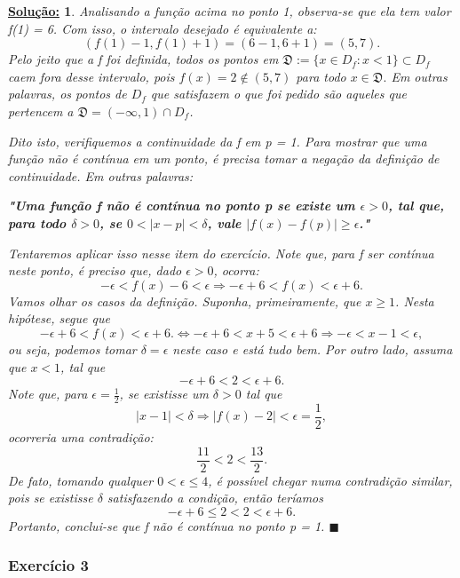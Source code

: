 \documentclass{article}
\newtheorem*{sol*}{\underline{Solu\c c\~ao:}}
\renewcommand\qedsymbol{$\blacksquare$}
\begin{document}
\begin{sol*}
Analisando a fun\c c\~ao acima no ponto 1, observa-se que ela tem valor f(1) = 6. Com isso, o intervalo desejado \'e equivalente a:
$$
(f(1) - 1, f(1) + 1) = (6 - 1, 6 + 1) = (5, 7).
$$
Pelo jeito que a f foi definida, todos os pontos em $\mathfrak{D}:=\{x\in{D_{f}}: x < 1\} \subset{D_{f}}$ caem fora desse intervalo, pois $f(x) = 2\notin{(5, 7)}$ para todo $x\in\mathfrak{D}.$ Em outras palavras, os pontos de $D_f$ que satisfazem o que foi pedido s\~ao aqueles que pertencem a $\mathfrak{D} = (-\infty, 1)\cap{D_{f}}$. 

Dito isto, verifiquemos a continuidade da f em p = 1. Para mostrar que uma fun\c c\~ao n\~ao \'e cont\'inua em um ponto, \'e precisa tomar a nega\c c\~ao da defini\c c\~ao de continuidade. Em outras palavras:

\textbf{ "Uma fun\c c\~ao f n\~ao \'e cont\'inua no ponto p se existe um $\epsilon > 0$, tal que, para todo $\delta > 0$, se $0 < |x - p| < \delta$, vale $|f(x) - f(p)|\geq\epsilon$."}

Tentaremos aplicar isso nesse item do exerc\'icio. Note que, para f ser cont\'inua neste ponto, \'e preciso que, dado $\epsilon > 0$, ocorra:
$$
-\epsilon < f(x) - 6 < \epsilon \Rightarrow -\epsilon + 6 < f(x) < \epsilon + 6.
$$
Vamos olhar os casos da defini\c c\~ao. Suponha, primeiramente, que $x\geq 1$. Nesta hip\'otese, segue que 
$$
-\epsilon + 6 < f(x) < \epsilon + 6. \Leftrightarrow -\epsilon + 6 < x + 5 < \epsilon + 6 \Rightarrow -\epsilon < x - 1 < \epsilon,
$$
ou seja, podemos tomar $\delta = \epsilon$ neste caso e est\'a tudo bem. Por outro lado, assuma que $x < 1$, tal que
$$
-\epsilon + 6 < 2 < \epsilon + 6.
$$
Note que, para $\epsilon = \frac{1}{2}$, se existisse um $\delta > 0$ tal que
$$
|x - 1| < \delta \Rightarrow |f(x) - 2| < \epsilon = \frac{1}{2},
$$
ocorreria uma contradi\c c\~ao:
$$
\frac{11}{2} < 2 < \frac{13}{2}.
$$
De fato, tomando qualquer $0 < \epsilon \leq 4$, \'e poss\'ivel chegar numa contradi\c c\~ao similar, pois se existisse $\delta$ satisfazendo a condi\c c\~ao, ent\~ao ter\'iamos
$$
-\epsilon + 6 \leq 2 < 2 < \epsilon + 6.
$$
Portanto, conclui-se que f n\~ao \'e cont\'inua no ponto p = 1.
\qedsymbol
\end{sol*}

\subsubsection{Exerc\'icio 3} 
\end{document}
